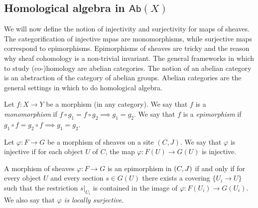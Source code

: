 \subsection{Homological algebra in $\mathsf{Ab}(X)$}

We will now define the notion of injectivity and surjectivity for maps of sheaves. The categorification of injective mpas are monomorphisms, while surjective maps correspond to epimorphisms. Epimorphisms of sheaves are tricky and the reason why sheaf cohomology is a non-trivial invariant. The general frameworks in which to study (co-)homology are abelian categories. The notion of an abelian category is an abstraction of the category of abelian groups. Abelian categories are the general settings in which to do homological algebra.

\begin{definition}
	Let $f: X \to Y$ be a morphism (in any category). We say that $f$ is a \textit{monomorphism} if $f \circ g_1 = f \circ g_2 \implies g_1 = g_2$.
	We say that $f$ is a \textit{epimorphism} if $g_1 \circ  f  = g_2 \circ f \implies g_1 = g_2$.
\end{definition}

\begin{proposition}[Monomorphisms in $\sh(C,J)$]
	Let $\varphi: F \to G$ be a morphism of sheaves on a site $(C,J)$. We say that $\varphi$ is injective if for each object $U$ of $C$, the map $\varphi: F(U) \to G(U)$ is injective.
\end{proposition}

\begin{proposition}[Epimorphisms in $\sh(C,J)$]
	A morphism of sheaves $\varphi: F \to G$ is an epimorphism in $\mathcal{(}C,J)$ if and only if for every object $U$ and every section $s \in G(U)$ there exists a covering $\{U_i \to U\}$ such that the restriction $s|_{U_i}$ is contained in the image of $\varphi: F(U_i) \to G(U_i)$. We also say that \textit{$\varphi$ is locally surjective}.
\end{proposition}

